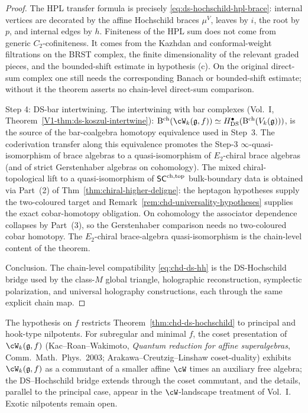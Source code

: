 \begin{proof}
The HPL transfer formula is precisely
\eqref{eq:ds-hochschild-hpl-brace}: internal vertices are decorated by
the affine Hochschild braces \(\mu^V\), leaves by \(i\), the root by
\(p\), and internal edges by \(h\).  Finiteness of the HPL sum does
not come from generic \(C_2\)-cofiniteness.  It comes from the Kazhdan
and conformal-weight filtrations on the BRST complex, the finite
dimensionality of the relevant graded pieces, and the bounded-shift
estimate in hypothesis \textup{(c)}.  On the original direct-sum
complex one still needs the corresponding Banach or bounded-shift
estimate; without it the theorem asserts no chain-level direct-sum
comparison.

Step 4: DS-bar intertwining. The intertwining with bar complexes
(Vol.~I, Theorem~\ref*{V1-thm:ds-koszul-intertwine}):
$\Barch(\cW_k(\fg, f)) \simeq H^\bullet_{\mathrm{DS}}(\Barch(V_k(\fg)))$,
is the source of the bar-coalgebra homotopy equivalence used in
Step~3.  The coderivation transfer along this equivalence promotes
the Step-3 $\infty$-quasi-isomorphism of brace algebras to a
quasi-isomorphism of $E_2$-chiral brace algebras (and of strict
Gerstenhaber algebras on cohomology). The mixed chiral-topological lift
to a quasi-isomorphism of $\mathsf{SC}^{\mathrm{ch},\mathrm{top}}$ bulk-boundary data is obtained via
Part~(2) of Thm~\ref{thm:chiral-higher-deligne}: the heptagon
hypotheses supply the two-coloured target and
Remark~\ref{rem:chd-universality-hypotheses} supplies the exact
cobar-homotopy obligation. On cohomology the associator dependence
collapses by Part~(3), so the Gerstenhaber comparison needs no
two-coloured cobar homotopy. The $E_2$-chiral brace-algebra
quasi-isomorphism is the chain-level content of the theorem.

Conclusion. The chain-level compatibility \eqref{eq:chd-ds-hh} is the
DS-Hochschild bridge used by the class-$M$ global triangle,
holographic reconstruction, symplectic polarization, and universal
holography constructions, each through the same explicit chain map.
\end{proof}

\begin{remark}%
\label{rem:chd-nonprincipal-nilpotents}%
The hypothesis on $f$ restricts Theorem~\ref{thm:chd-ds-hochschild} to
principal and hook-type nilpotents. For subregular and minimal $f$,
the coset presentation of $\cW_k(\fg,f)$ (Kac--Roan--Wakimoto,
\emph{Quantum reduction for affine superalgebras}, Comm.~Math.~Phys.\
2003; Arakawa--Creutzig--Linshaw coset-duality) exhibits
$\cW_k(\fg,f)$ as a commutant of a smaller affine $\cW$ times an
auxiliary free algebra; the DS--Hochschild bridge extends through the
coset commutant, and the details, parallel to the principal case,
appear in the $\cW$-landscape treatment of Vol.~I. Exotic nilpotents
remain open.
\end{remark}


